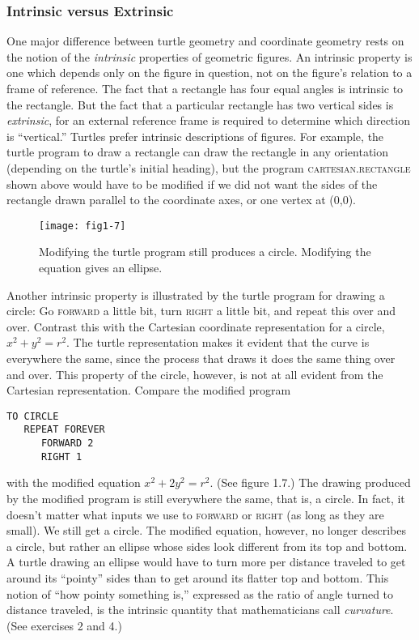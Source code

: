 \documentclass{book}
\begin{document}
\subsubsection{Intrinsic versus Extrinsic}

One major difference between turtle geometry and coordinate geometry
rests on the notion of the {\em intrinsic} properties of geometric figures. An
intrinsic property is one which depends only on the figure in question,
not on the figure's relation to a frame of reference. The fact that a
rectangle has four equal angles is intrinsic to the rectangle. But the
fact that a particular rectangle has two vertical sides is {\em extrinsic}, for
an external reference frame is required to determine which direction is
``vertical.'' Turtles prefer intrinsic descriptions of figures. For example,
the turtle program to draw a rectangle can draw the rectangle in any
orientation (depending on the turtle's initial heading), but the program
\textsc{cartesian.rectangle} shown above would have to be modified if we
did not want the sides of the rectangle drawn parallel to the coordinate
axes, or one vertex at (0,0).

\begin{figure}
\begin{center}
\texttt{[image: fig1-7]}
\caption{Modifying the turtle program still produces a circle. Modifying the equation gives an ellipse.}
\end{center}
\end{figure}

Another intrinsic property is illustrated by the turtle program for
drawing a circle: Go \textsc{forward} a little bit, turn \textsc{right} a little bit, and
repeat this over and over. Contrast this with the Cartesian coordinate
representation for a circle, $x^2 + y^2 = r^2$. The turtle representation
makes it evident that the curve is everywhere the same, since the process
that draws it does the same thing over and over. This property of the
circle, however, is not at all evident from the Cartesian representation.
Compare the modified program
\begin{verbatim}
TO CIRCLE
   REPEAT FOREVER
      FORWARD 2
      RIGHT 1
\end{verbatim}with the modified equation $x^2 + 2y^2 = r^2$. (See figure 1.7.) The drawing
produced by the modified program is still everywhere the same, that is, a
circle. In fact, it doesn't matter what inputs we use to \textsc{forward} or \textsc{right}
(as long as they are small). We still get a circle. The modified equation,
however, no longer describes a circle, but rather an ellipse whose sides
look different from its top and bottom. A turtle drawing an ellipse would
have to turn more per distance traveled to get around its ``pointy'' sides
than to get around its flatter top and bottom. This notion of ``how
pointy something is,'' expressed as the ratio of angle turned to distance
traveled, is the intrinsic quantity that mathematicians call {\em curvature}.
(See exercises 2 and 4.)
\end{document}
